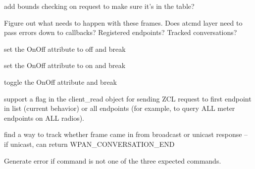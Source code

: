 
\begin{DoxyRefList}
\item[\label{todo__todo000009}%
\hypertarget{todo__todo000009}{}%
Global \hyperlink{group__xbee__atcmd_ga899d5ef84ca5790c3c76b965f88874e0}{\-\_\-xbee\-\_\-cmd\-\_\-release\-\_\-request} (\hyperlink{structxbee__cmd__request__t}{xbee\-\_\-cmd\-\_\-request\-\_\-t} F\-A\-R $\ast$request)]add bounds checking on request to make sure it's in the table?  
\item[\label{todo__todo000031}%
\hypertarget{todo__todo000031}{}%
Global \hyperlink{group__xbee__wpan_ga56d68291ceee384fbd8a5833eb91182c}{\-\_\-xbee\-\_\-handle\-\_\-transmit\-\_\-status} (\hyperlink{structxbee__dev__t}{xbee\-\_\-dev\-\_\-t} $\ast$xbee, const void F\-A\-R $\ast$payload, uint16\-\_\-t length, void F\-A\-R $\ast$context)]Figure out what needs to happen with these frames. Does atcmd layer need to pass errors down to callbacks? Registered endpoints? Tracked conversations?  
\item[\label{todo__todo000018}%
\hypertarget{todo__todo000018}{}%
Global \hyperlink{group__zcl__onoff_gae7dc87cd27559c9ae0499ac542ab6107}{\-\_\-zcl\-\_\-onoff\-\_\-handler} (const \hyperlink{structwpan__envelope__t}{wpan\-\_\-envelope\-\_\-t} F\-A\-R $\ast$envelope, void F\-A\-R $\ast$context)]set the On\-Off attribute to off and break 

set the On\-Off attribute to on and break 

toggle the On\-Off attribute and break  
\item[\label{todo__todo000014}%
\hypertarget{todo__todo000014}{}%
Global \hyperlink{group__zcl__client_ga15f191f3166c71f3f436b2a32d108a9f}{\-\_\-zcl\-\_\-send\-\_\-read\-\_\-from\-\_\-zdo\-\_\-match} (\hyperlink{structwpan__conversation__t}{wpan\-\_\-conversation\-\_\-t} F\-A\-R $\ast$conversation, const \hyperlink{structwpan__envelope__t}{wpan\-\_\-envelope\-\_\-t} F\-A\-R $\ast$envelope)]support a flag in the client\-\_\-read object for sending Z\-C\-L request to first endpoint in list (current behavior) or all endpoints (for example, to query A\-L\-L meter endpoints on A\-L\-L radios).

find a way to track whether frame came in from broadcast or unicast response -- if unicast, can return W\-P\-A\-N\-\_\-\-C\-O\-N\-V\-E\-R\-S\-A\-T\-I\-O\-N\-\_\-\-E\-N\-D  
\item[\label{todo__todo000022}%
\hypertarget{todo__todo000022}{}%
Global \hyperlink{group__zcl_gaff3abb5d2022101c2873e7a8e8b027e5}{\-\_\-zcl\-\_\-write\-\_\-attributes} (\hyperlink{structzcl__command__t}{zcl\-\_\-command\-\_\-t} $\ast$cmd)]Generate error if command is not one of the three expected commands.


\end{DoxyRefList}
